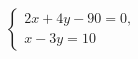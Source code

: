 \begin{ex}
	\begin{condition}
		\( \left\{
		\begin{array}{l}
			2x+4y-90=0,\\
			x-3y=10
		\end{array}
		\right. \)
	\end{condition}
\end{ex}